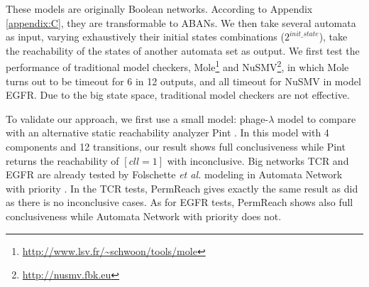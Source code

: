 \documentclass[runningheads]{llncs}
\begin{document}
These models are originally Boolean networks.
According to Appendix \ref{appendix:C}, they are transformable to ABANs. We then take several automata as input, varying exhaustively their initial states combinations ($2^{init\_state}$), take the reachability of the states of another automata set as output.
We first test the performance of traditional model checkers, Mole\footnote{\url{http://www.lsv.fr/~schwoon/tools/mole}} and NuSMV\footnote{\url{http://nusmv.fbk.eu}}, in which Mole turns out to be timeout for 6 in 12 outputs, and all timeout for NuSMV in model EGFR.
Due to the big state space, traditional model checkers are not effective. 

To validate our approach, we first use a small model: phage-$\lambda$ model \cite{thieffry1995dynamical} to compare with an alternative static reachability analyzer Pint \cite{pauleve2012}. In this model with 4 components and 12 transitions, our result shows full conclusiveness while Pint returns the reachability of $[cll=1]$ with inconclusive.
Big networks TCR and EGFR are already tested by Folschette \textit{et al.} modeling in Automata Network with priority \cite{folschette2015}. 
In the TCR tests, PermReach gives exactly the same result as \cite{folschette2015} did as there is no inconclusive cases. As for EGFR tests, PermReach shows also full conclusiveness while Automata Network with priority does not.
\end{document}
